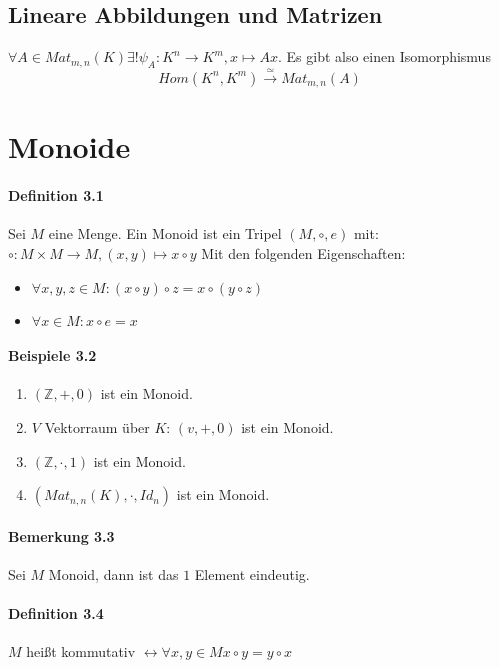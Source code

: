 \documentclass{scrartcl}
\begin{document}
\subsection{Lineare Abbildungen und Matrizen}
\label{subsec:lineareabbildungenundmatrizen}

$\forall A \in Mat_{m,n}(K) \exists ! \psi_A: K^n \to K^m, x \mapsto Ax$. Es gibt
also einen Isomorphismus
\[Hom(K^n,K^m) \overset{\simeq}{\to} Mat_{m,n}(A)\]

\section{Monoide}
\label{sec:monoide}
\paragraph{Definition 3.1} Sei $M$ eine Menge. Ein Monoid ist ein Tripel $\left(
  M, \circ, e \right)$ mit: \\
$\circ: M \times M \to M, (x, y) \mapsto x \circ y$
Mit den folgenden Eigenschaften:
\begin{itemize}
\item $\forall x,y,z \in M: \left( x \circ y \right) \circ z = x \circ \left(
    y \circ z \right)$
\item $\forall x \in M: x \circ e = x$
\end{itemize}

\paragraph{Beispiele 3.2}
\begin{enumerate}
\item $ \left( \mathbb{Z}, +, 0 \right) $ ist ein Monoid.
\item $V$ Vektorraum über $K$: $\left( v, +, 0 \right)$ ist ein Monoid.
\item $\left( \mathbb{Z}, \cdot, 1 \right)$ ist ein Monoid.
\item $ \left( Mat_{n,n}(K), \cdot, Id_n \right)$ ist ein Monoid.
\end{enumerate}

\paragraph{Bemerkung 3.3}
Sei $M$ Monoid, dann ist das $1$ Element eindeutig.

\paragraph{Definition 3.4} $M$ heißt kommutativ $\leftrightarrow \forall x,y \in
M x \circ y = y \circ x$
\end{document}
